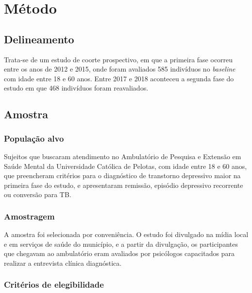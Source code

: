 \documentclass[chapter=TITLE,
               oneside,
               12pt,
               a4paper,
               english,
               brazil]{abntex2}    %
\begin{document}
\vspace{\onelineskip}
\chapter{Método}\label{sec:metodo}

    \section{Delineamento}\label{sec:delineamento}

        Trata-se de um estudo de coorte prospectivo, em que a primeira fase ocorreu
        entre os anos de 2012 e 2015, onde foram avaliados 585 indivíduos no
        \textit{baseline} com idade entre 18 e 60 anos.
        Entre 2017 e 2018 aconteceu a segunda fase do estudo em que 468 indivíduos
        foram reavaliados.

    \section{Amostra}\label{sec:sujeitos}

        \subsection{População alvo}

            Sujeitos que buscaram atendimento no Ambulatório de Pesquisa e Extensão
            em Saúde Mental da Universidade Católica de Pelotas, com idade entre 18
            e 60 anos, que preencheram critérios para o diagnóstico de transtorno
            depressivo maior na primeira fase do estudo, e apresentaram remissão,
            episódio depressivo recorrente ou conversão para TB.

        \subsection{Amostragem} 
    
            A amostra foi selecionada por conveniência. O estudo foi divulgado na mídia
            local e em serviços de saúde do município, e a partir da divulgação,
            os participantes que chegavam ao ambulatório eram avaliados por psicólogos
            capacitados para realizar a entrevista clínica diagnóstica.

        \subsection{Critérios de elegibilidade}
\end{document}
